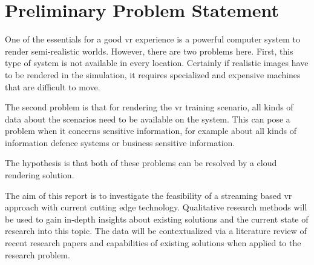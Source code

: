 \section{Preliminary Problem Statement}
One of the essentials for a good \acrfull{vr} experience is a powerful computer system to render semi-realistic
worlds. However, there are two problems here. First, this type of system is not available in every location.
Certainly if realistic images have to be rendered in the simulation, it requires specialized and expensive machines that are difficult to move. 

The second problem is that for rendering the \acrshort{vr} training scenario, all kinds of data about the scenarios need to be available on the system. 
This can pose a problem when it concerns sensitive information, for example about all kinds of information defence systems or business sensitive information.

The hypothesis is that both of these problems can be resolved by a cloud rendering solution.

The aim of this report is to investigate the feasibility of a streaming based \acrshort{vr} approach with current cutting edge technology.
Qualitative research methods will be used to gain in-depth insights about existing solutions and the current state of research into this topic.
The data will be contextualized via a literature review of recent research papers and capabilities of existing solutions when applied to the research problem.